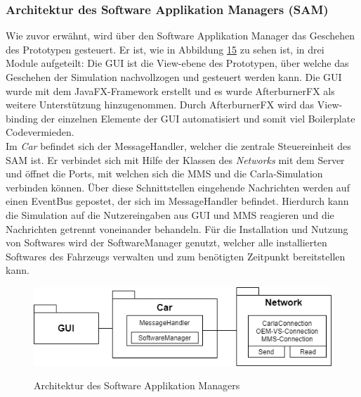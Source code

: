 \subsubsection{Architektur des Software Applikation Managers (SAM)}
Wie zuvor erwähnt, wird über den Software Applikation Manager das Geschehen des Prototypen gesteuert. Er ist, wie in Abbildung \hyperref[img:sam]{15} zu sehen ist, in drei Module aufgeteilt: Die GUI ist die View-ebene des Prototypen, über welche das Geschehen der Simulation nachvollzogen und gesteuert werden kann. Die GUI wurde mit dem JavaFX-Framework erstellt und es wurde AfterburnerFX als weitere Unterstützung hinzugenommen. Durch AfterburnerFX wird das View-binding der einzelnen Elemente der GUI automatisiert und somit viel \glqq Boilerplate Code\grqq vermieden.\\
Im \textit{Car} befindet sich der MessageHandler, welcher die zentrale Steuereinheit des SAM ist. Er verbindet sich mit Hilfe der Klassen des \textit{Networks} mit dem Server und öffnet die Ports, mit welchen sich die MMS und die Carla-Simulation verbinden können. Über diese Schnittstellen eingehende Nachrichten werden auf einen EventBus gepostet, der sich im MessageHandler befindet. Hierdurch kann die Simulation auf die Nutzereingaben aus GUI und MMS reagieren und die Nachrichten getrennt voneinander behandeln. Für die Installation und Nutzung von Softwares wird der SoftwareManager genutzt, welcher alle installierten Softwares des Fahrzeugs verwalten und zum benötigten Zeitpunkt bereitstellen kann.
\begin{figure}[!h]
	\centering
	\includegraphics[width=0.8\columnwidth]{pictures/konzept-SAM.png}
	\label{img:sam}
	\caption{Architektur des Software Applikation Managers}
\end{figure}

